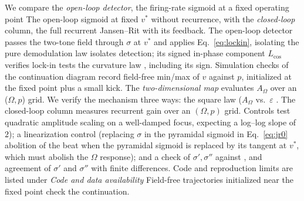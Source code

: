 \documentclass[11pt,a4paper]{article}
\newcommand{\Sig}{\sigma}
\providecommand{\DIFaddtex}[1]{{\protect\color{blue} \sf #1}} %
\providecommand{\DIFdeltex}[1]{{\protect\color{red} \scriptsize #1}} %
\providecommand{\DIFaddbegin}{} %
\providecommand{\DIFaddend}{} %
\providecommand{\DIFdelbegin}{} %
\providecommand{\DIFdelend}{} %
\providecommand{\DIFadd}[1]{\texorpdfstring{\DIFaddtex{#1}}{#1}} %
\providecommand{\DIFdel}[1]{\texorpdfstring{\DIFdeltex{#1}}{}} %
\begin{document}
\DIFdelbegin \DIFdel{We compare the \emph{open-loop detector}, the firing-rate sigmoid at a fixed operating point }\DIFdelend \DIFaddbegin \DIFadd{The open-loop sigmoid at fixed }\DIFaddend $v^*$ \DIFdelbegin \DIFdel{without recurrence, with the \emph{closed-loop} column, the full recurrent
Jansen--Rit with its feedback. The open-loop detector passes the two-tone field through
$\Sig$ at $v^*$ and applies Eq.~\eqref{eq:lockin}, isolating the pure demodulation law}\DIFdelend \DIFaddbegin \DIFadd{isolates detection}\DIFaddend ; its signed \DIFdelbegin \DIFdel{in-phase
component $L_{\cos}$ verifies }\DIFdelend \DIFaddbegin \DIFadd{lock-in
tests }\DIFaddend the curvature law\DIFdelbegin \DIFdel{, including its sign. Simulation checks of the continuation diagram record field-free min/max of $v$
against $p$, initialized at the fixed point plus a small kick. The \emph{two-dimensional map} evaluates
$A_\Omega$ over
an ($\Omega,p$) grid. We verify the mechanism three ways: the
square law ($A_\Omega$ vs.\ $\varepsilon$ }\DIFdelend \DIFaddbegin \DIFadd{. The closed-loop column measures recurrent gain over
an $(\Omega,p)$ grid. Controls test quadratic amplitude scaling }\DIFaddend on a well-damped
focus, \DIFdelbegin \DIFdel{expecting a
log--log slope of $2$); a linearization control (replacing $\Sig$ in
the pyramidal sigmoid in Eq.~\eqref{eq:jr0} }\DIFdelend \DIFaddbegin \DIFadd{abolition of the beat when the pyramidal sigmoid is replaced }\DIFaddend by its
tangent\DIFdelbegin \DIFdel{at $v^*$, which must abolish the $\Omega$
response); and a check of $\Sig',\Sig''$ against }\DIFdelend \DIFaddbegin \DIFadd{, and agreement of $\Sig'$ and $\Sig''$ with }\DIFaddend finite differences.
\DIFdelbegin \DIFdel{Code and reproduction limits are listed under \emph{Code and data availability}}\DIFdelend \DIFaddbegin \DIFadd{Field-free trajectories initialized near the fixed point check the continuation}\DIFaddend .
\end{document}

